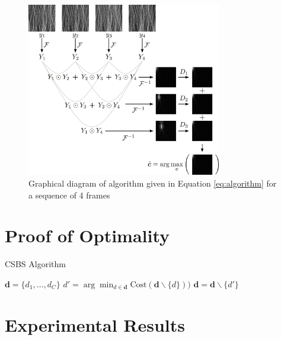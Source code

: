 \documentclass{article}
\begin{document}
\begin{figure}[htb]
  \begin{minipage}[b]{1\linewidth}
    \centering
    \centerline{\includegraphics[width=8.5cm]{images/algorithm.png}}
  \end{minipage}
  \caption{Graphical diagram of algorithm given in Equation \ref{eq:algorithm} for a sequence of 4 frames}
  \label{fig:algorithm}
\end{figure}

\section{Proof of Optimality}
\label{sec:optimality}


\begin{algorithm}
  \begin{algorithmic}
    \caption{CSBS Algorithm}
    \State $\bm{d} = \{d_1, \dots, d_C\}$
    \Repeat
      \State $d' = \arg \min_{d \in \bm{d}} \text{Cost}(\bm{d} \backslash \{d\}))$
      \State $\bm{d} = \bm{d} \backslash \{d'\}$
  \end{algorithmic}
\end{algorithm}


\section{Experimental Results}
\label{sec:results}
\end{document}
